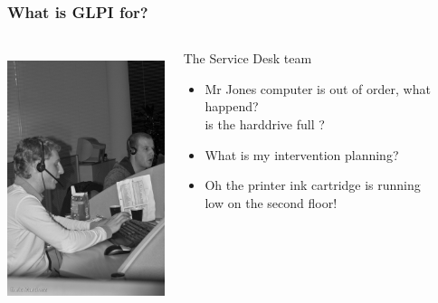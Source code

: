 \documentclass{beamer}
\begin{document}
\begin{frame}
    \frametitle{What is GLPI for?}

 \begin{columns}
 \begin{column}{0.1\textwidth}
         \includegraphics[height=7.5cm]{./pics/helpdesk.jpg}
 \end{column}
 \begin{column}{1\textwidth}

    \begin{block}{The Service Desk team}
        \begin{itemize}
            \item Mr Jones computer is out of order, what happend? \\
		is the harddrive full ?
            \item What is my intervention planning?
            \item Oh the printer ink cartridge is running \\
                low on the second floor!
        \end{itemize}
    \end{block}
 \end{column}
\end{columns}


\end{frame}
\end{document}
